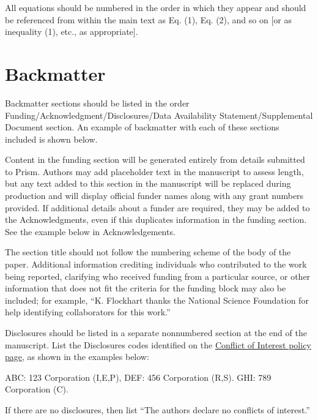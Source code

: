 \documentclass{optica-article}
\begin{document}
All equations should be numbered in the order in which they appear
and should be referenced  from within the main text as Eq. (1),
Eq. (2), and so on [or as inequality (1), etc., as appropriate].

\section{Backmatter}

Backmatter sections should be listed in the order
Funding/Acknowledgment/Disclosures/Data Availability Statement/Supplemental
Document section. An example of backmatter with each of these sections included
is shown below.

\begin{backmatter}
	Content in the funding section will be generated entirely from details
	submitted to Prism. Authors may add placeholder text in the manuscript to
	assess length, but any text added to this section in the manuscript will be
	replaced during production and will display official funder names along with
	any grant numbers provided. If additional details about a funder are
	required, they may be added to the Acknowledgments, even if this duplicates
	information in the funding section. See the example below in Acknowledgements.

	The section title should not follow the numbering scheme of the body of the
	paper. Additional information crediting individuals who contributed to the
	work being reported, clarifying who received funding from a particular
	source, or other information that does not fit the criteria for the funding
	block may also be included; for example, ``K. Flockhart thanks the National
	Science Foundation for help identifying collaborators for this work.''

	Disclosures should be listed in a separate nonnumbered section at the end of
	the manuscript. List the Disclosures codes identified on the
	\href{https://opg.optica.org/submit/review/conflicts-interest-policy.cfm}
	{Conflict of Interest policy page}, as shown in the examples below:

	\medskip

	\noindent ABC: 123 Corporation (I,E,P), DEF: 456 Corporation (R,S). GHI: 789
	Corporation (C).

	\medskip

	\noindent If there are no disclosures, then list ``The authors declare no
	conflicts of interest.''



\end{backmatter}
\end{document}

